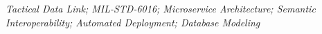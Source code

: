 \vspace{0.5cm}
\hspace{-1cm}
{\bf{}} \textit{Tactical Data Link; MIL-STD-6016; Microservice Architecture; Semantic Interoperability; Automated Deployment; Database Modeling}


































